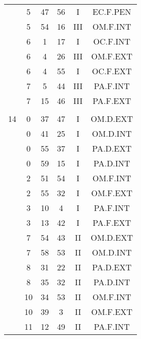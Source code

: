 \documentclass[12pt, a4paper]{article}
\begin{document}
\begin{multicols}{3}
{\begin{tabular}{c c c c c c}
	 	 	 	 & 5 & 47 & 56 & I & EC.F.PEN\\%
	 	 	 	 & 5 & 54 & 16 & III & OM.F.INT\\%
	 	 	 	 & 6 & 1 & 17 & I & OC.F.INT\\%
	 	 	 	 & 6 & 4 & 26 & III & OM.F.EXT\\%
	 	 	 	 & 6 & 4 & 55 & I & OC.F.EXT\\%
	 	 	 	 & 7 & 5 & 44 & III & PA.F.INT\\%
	 	 	 	 & 7 & 15 & 46 & III & PA.F.EXT\\%
	 	 	 	 & & & & & \\%
	 	 	 	14 & 0 & 37 & 47 & I & OM.D.EXT\\%
	 	 	 	 & 0 & 41 & 25 & I & OM.D.INT\\%
	 	 	 	 & 0 & 55 & 37 & I & PA.D.EXT\\%
	 	 	 	 & 0 & 59 & 15 & I & PA.D.INT\\%
	 	 	 	 & 2 & 51 & 54 & I & OM.F.INT\\%
	 	 	 	 & 2 & 55 & 32 & I & OM.F.EXT\\%
	 	 	 	 & 3 & 10 & 4 & I & PA.F.INT\\%
	 	 	 	 & 3 & 13 & 42 & I & PA.F.EXT\\%
	 	 	 	 & 7 & 54 & 43 & II & OM.D.EXT\\%
	 	 	 	 & 7 & 58 & 53 & II & OM.D.INT\\%
	 	 	 	 & 8 & 31 & 22 & II & PA.D.EXT\\%
	 	 	 	 & 8 & 35 & 32 & II & PA.D.INT\\%
	 	 	 	 & 10 & 34 & 53 & II & OM.F.INT\\%
	 	 	 	 & 10 & 39 & 3 & II & OM.F.EXT\\%
	 	 	 	 & 11 & 12 & 49 & II & PA.F.INT\\%

\end{tabular}}
\end{multicols}
\end{document}
